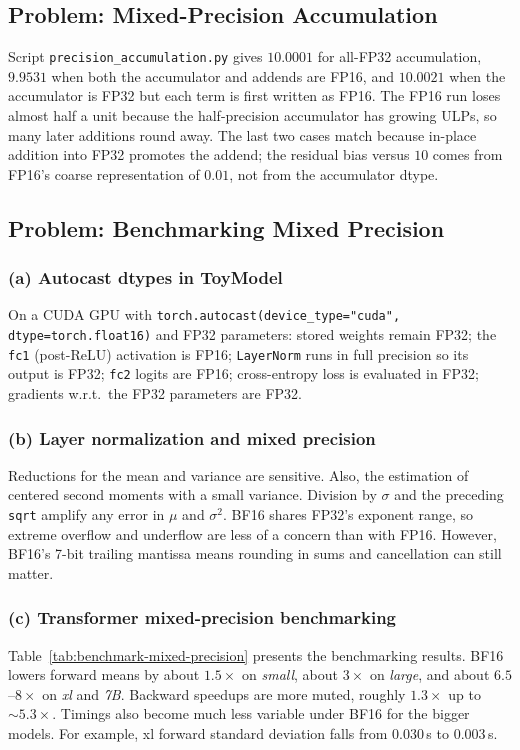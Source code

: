 \documentclass[11pt]{article}
\newcommand{\question}[1]{\subsection*{#1}}
\newcommand{\subquestion}[1]{\subsubsection*{#1}}
\begin{document}
\question{Problem: Mixed-Precision Accumulation}
Script \texttt{precision\_accumulation.py} gives $10.0001$ for all-FP32 accumulation, $9.9531$ when both the accumulator and addends are FP16, and $10.0021$ when the accumulator is FP32 but each term is first written as FP16. The FP16 run loses almost half a unit because the half-precision accumulator has growing ULPs, so many later additions round away. The last two cases match because in-place addition into FP32 promotes the addend; the residual bias versus $10$ comes from FP16's coarse representation of $0.01$, not from the accumulator dtype.

\question{Problem: Benchmarking Mixed Precision}
\subquestion{(a) Autocast dtypes in ToyModel}
On a CUDA GPU with \texttt{torch.autocast(device\_type="cuda", dtype=torch.float16)} and FP32 parameters: stored weights remain FP32; the \texttt{fc1} (post-ReLU) activation is FP16; \texttt{LayerNorm} runs in full precision so its output is FP32; \texttt{fc2} logits are FP16; cross-entropy loss is evaluated in FP32; gradients w.r.t.\ the FP32 parameters are FP32.

\subquestion{(b) Layer normalization and mixed precision}
Reductions for the mean and variance are sensitive. Also, the estimation of centered second moments with a small variance. Division by $\sigma$ and the preceding \texttt{sqrt} amplify any error in $\mu$ and $\sigma^2$. BF16 shares FP32's exponent range, so extreme overflow and underflow are less of a concern than with FP16. However, BF16's 7-bit trailing mantissa means rounding in sums and cancellation can still matter.

\subquestion{(c) Transformer mixed-precision benchmarking}
\begin{table}[H]
  \centering
  
  \caption{Forward and backward timings on Modal B200, batch size 4, context length 256, $5$ warm-up and $10$ timed steps per configuration;}
  \label{tab:benchmark-mixed-precision}
\end{table}

Table~\ref{tab:benchmark-mixed-precision} presents the benchmarking results. BF16 lowers forward means by about $1.5\times$ on \emph{small}, about $3\times$ on \emph{large}, and about $6.5$--$8\times$ on \emph{xl} and \emph{7B}. Backward speedups are more muted, roughly $1.3\times$ up to $\sim5.3\times$. Timings also become much less variable under BF16 for the bigger models. For example, xl forward standard deviation falls from $0.030$\,s to $0.003$\,s.
\end{document}
